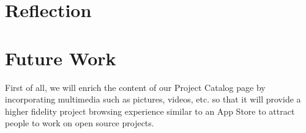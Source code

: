 \documentclass[12pt]{article}
\renewcommand{\_}{\kern-1.5pt\textunderscore\kern-1.5pt}
\begin{document}






\renewcommand\thesection{\arabic{section}}
\renewcommand\thesubsection{\thesection.\arabic{subsection}}

\section{Reflection}


\section{Future Work}
First of all, we will enrich the content of our Project Catalog page by incorporating multimedia such as pictures, videos, etc. so that it will provide a higher fidelity project browsing experience similar to an App Store to attract people to work on open source projects.
\end{document}

